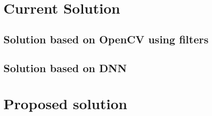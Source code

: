 \section{Current Solution}

\subsection{Solution based on OpenCV using filters}

\subsection{Solution based on DNN}


\section{Proposed solution}
 
